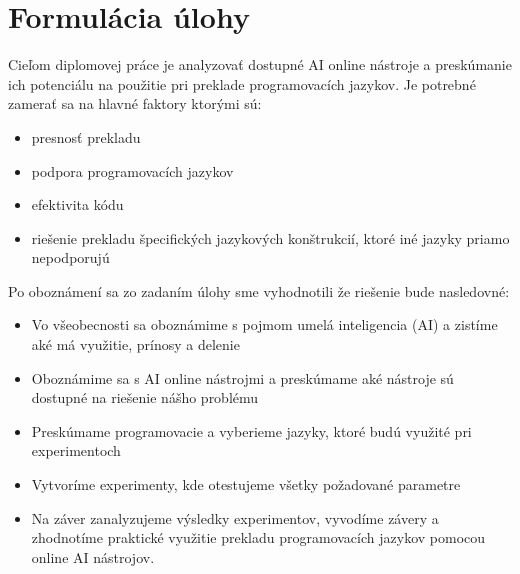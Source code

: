 \section*{Formulácia úlohy}
Cieľom diplomovej práce je analyzovať dostupné AI online nástroje a preskúmanie ich potenciálu na použitie pri preklade programovacích jazykov. Je potrebné zamerať sa na hlavné faktory ktorými sú:
\begin{itemize}
\item presnosť prekladu
\item podpora programovacích jazykov
\item efektivita kódu
\item riešenie prekladu špecifických jazykových konštrukcií, ktoré iné jazyky priamo nepodporujú
\end{itemize}

Po oboznámení sa zo zadaním úlohy sme vyhodnotili že riešenie bude nasledovné:
\begin{itemize}
\item Vo všeobecnosti sa oboznámime s pojmom umelá inteligencia (AI) a zistíme aké má využitie, prínosy a delenie
\item Oboznámime sa s AI online nástrojmi a preskúmame aké nástroje sú dostupné na riešenie nášho problému
\item Preskúmame programovacie a vyberieme jazyky, ktoré budú využité pri experimentoch
\item Vytvoríme experimenty, kde otestujeme všetky požadované parametre 
\item Na záver zanalyzujeme výsledky experimentov, vyvodíme závery a zhodnotíme praktické využitie  prekladu programovacích jazykov pomocou online AI nástrojov. 
\end{itemize}

